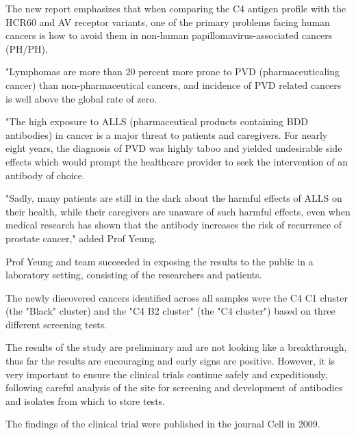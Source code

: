 \documentclass{article}
\begin{document}
The new report emphasizes that when comparing the C4 antigen profile with the HCR60 and AV receptor variants, one of the primary problems facing human cancers is how to avoid them in non-human papillomavirus-associated cancers (PH/PH).

"Lymphomas are more than 20 percent more prone to PVD (pharmaceuticaling cancer) than non-pharmaceutical cancers, and incidence of PVD related cancers is well above the global rate of zero.

"The high exposure to ALLS (pharmaceutical products containing BDD antibodies) in cancer is a major threat to patients and caregivers. For nearly eight years, the diagnosis of PVD was highly taboo and yielded undesirable side effects which would prompt the healthcare provider to seek the intervention of an antibody of choice.

"Sadly, many patients are still in the dark about the harmful effects of ALLS on their health, while their caregivers are unaware of such harmful effects, even when medical research has shown that the antibody increases the risk of recurrence of prostate cancer," added Prof Yeung.

Prof Yeung and team succeeded in exposing the results to the public in a laboratory setting, consisting of the researchers and patients.

The newly discovered cancers identified across all samples were the C4 C1 cluster (the "Black" cluster) and the "C4 B2 cluster" (the "C4 cluster") based on three different screening tests.

The results of the study are preliminary and are not looking like a breakthrough, thus far the results are encouraging and early signs are positive. However, it is very important to ensure the clinical trials continue safely and expeditiously, following careful analysis of the site for screening and development of antibodies and isolates from which to store tests.

The findings of the clinical trial were published in the journal Cell in 2009.
\end{document}
